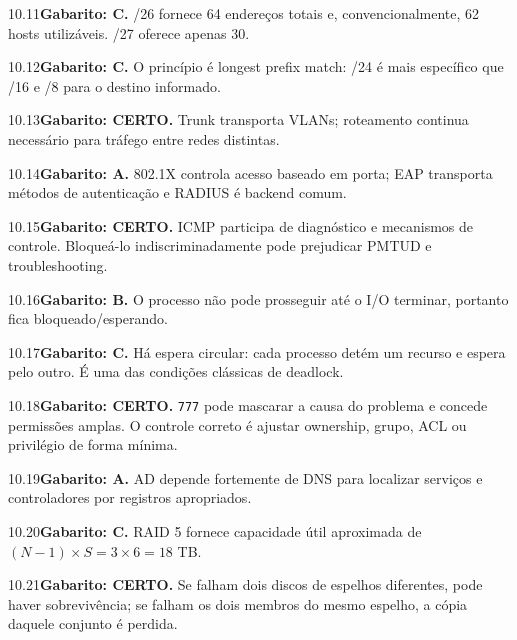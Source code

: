 \begin{solucao}{10.11}\textbf{Gabarito: C.} /26 fornece 64 endereços totais e, convencionalmente, 62 hosts utilizáveis. /27 oferece apenas 30.\end{solucao}
\begin{solucao}{10.12}\textbf{Gabarito: C.} O princípio é longest prefix match: /24 é mais específico que /16 e /8 para o destino informado.\end{solucao}
\begin{solucao}{10.13}\textbf{Gabarito: CERTO.} Trunk transporta VLANs; roteamento continua necessário para tráfego entre redes distintas.\end{solucao}
\begin{solucao}{10.14}\textbf{Gabarito: A.} 802.1X controla acesso baseado em porta; EAP transporta métodos de autenticação e RADIUS é backend comum.\end{solucao}
\begin{solucao}{10.15}\textbf{Gabarito: CERTO.} ICMP participa de diagnóstico e mecanismos de controle. Bloqueá-lo indiscriminadamente pode prejudicar PMTUD e troubleshooting.\end{solucao}
\begin{solucao}{10.16}\textbf{Gabarito: B.} O processo não pode prosseguir até o I/O terminar, portanto fica bloqueado/esperando.\end{solucao}
\begin{solucao}{10.17}\textbf{Gabarito: C.} Há espera circular: cada processo detém um recurso e espera pelo outro. É uma das condições clássicas de deadlock.\end{solucao}
\begin{solucao}{10.18}\textbf{Gabarito: CERTO.} \texttt{777} pode mascarar a causa do problema e concede permissões amplas. O controle correto é ajustar ownership, grupo, ACL ou privilégio de forma mínima.\end{solucao}
\begin{solucao}{10.19}\textbf{Gabarito: A.} AD depende fortemente de DNS para localizar serviços e controladores por registros apropriados.\end{solucao}
\begin{solucao}{10.20}\textbf{Gabarito: C.} RAID 5 fornece capacidade útil aproximada de $(N-1)\times S = 3\times6=18$ TB.\end{solucao}
\begin{solucao}{10.21}\textbf{Gabarito: CERTO.} Se falham dois discos de espelhos diferentes, pode haver sobrevivência; se falham os dois membros do mesmo espelho, a cópia daquele conjunto é perdida.\end{solucao}
